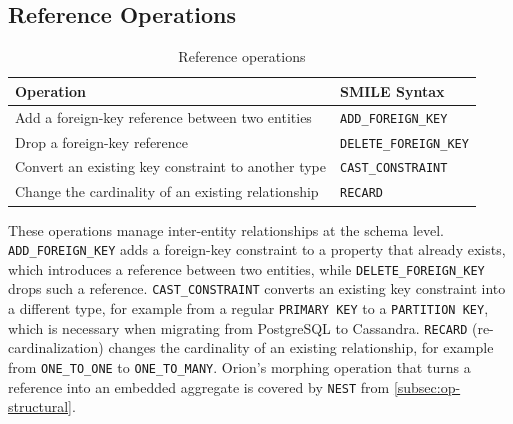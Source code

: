 \subsection{Reference Operations}\label{subsec:op-reference}
  \begin{table}[h]
  \centering
  \small
  \begin{tabular}{ll}
  \toprule
  \textbf{Operation} & \textbf{SMILE Syntax} \\
  \midrule
  Add a foreign-key reference between two entities & \texttt{ADD\_FOREIGN\_KEY}    \\
  Drop a foreign-key reference                     & \texttt{DELETE\_FOREIGN\_KEY} \\
  Convert an existing key constraint to another type & \texttt{CAST\_CONSTRAINT}   \\
  Change the cardinality of an existing relationship & \texttt{RECARD}             \\
  \bottomrule
  \end{tabular}
  \caption{Reference operations}
  \label{tab:ops-reference}
  \end{table}
These operations manage inter-entity relationships at the schema level. \texttt{ADD\_FOREIGN\_KEY}
  adds a foreign-key constraint to a property that already exists, which introduces a reference
  between two entities, while \texttt{DELETE\_FOREIGN\_KEY} drops such a reference.
  \texttt{CAST\_CONSTRAINT} converts an existing key constraint into a different type, for example
  from a regular \texttt{PRIMARY KEY} to a \texttt{PARTITION KEY}, which is necessary when migrating
  from PostgreSQL to Cassandra. \texttt{RECARD} (re-cardinalization) changes the cardinality of an
  existing relationship, for example from \texttt{ONE\_TO\_ONE} to \texttt{ONE\_TO\_MANY}. Orion's
  morphing operation that turns a reference into an embedded aggregate is covered by \texttt{NEST}
  from \autoref{subsec:op-structural}.
